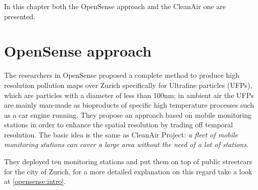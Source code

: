 \documentclass[11pt,a4paper,titlepage]{book}
\begin{document}
In this chapter both the OpenSense approach and the CleanAir one are presented.

\section{OpenSense approach}
The researchers in OpenSense proposed a complete method to produce high resolution pollution maps over Zurich \cite{opensense} specifically for Ultrafine particles (UFPs), which are particles with a diameter of less than 100nm; in ambient air the UFPs are mainly man-made as bioproducts of specific high temperature processes such as a car engine running.
\newline
\newline
They propose an approach based on mobile monitoring stations in order to enhance the spatial resolution by trading off temporal resolution. The basic idea is the same as CleanAir Project: \textit{a fleet of mobile monitoring stations can cover a large area without the need of a lot of stations}.

They deployed ten monitoring stations and put them on top of public streetcars for the city of Zurich, for a more detailed explanation on this regard take a look at \ref{opensense:intro}. 
\end{document}
